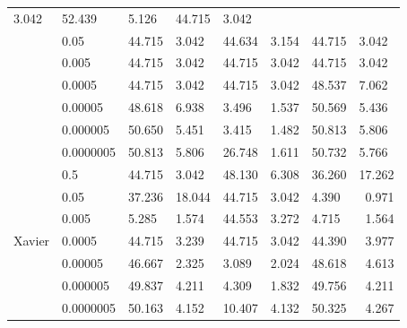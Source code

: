 \begin{table}[H]
\begin{tabular}{cl|llllll|}
    \multicolumn{1}{l|}{3.042} &
    52.439 &
    \multicolumn{1}{l|}{5.126} &
    44.715 &
    3.042 \\
\multicolumn{1}{|c|}{} &
    0.05 &
    44.715 &
    \multicolumn{1}{l|}{3.042} &
    44.634 &
    \multicolumn{1}{l|}{3.154} &
    44.715 &
    3.042 \\
\multicolumn{1}{|c|}{} &
    0.005 &
    44.715 &
    \multicolumn{1}{l|}{3.042} &
    44.715 &
    \multicolumn{1}{l|}{3.042} &
    44.715 &
    3.042 \\
\multicolumn{1}{|c|}{} &
    0.0005 &
    44.715 &
    \multicolumn{1}{l|}{3.042} &
    44.715 &
    \multicolumn{1}{l|}{3.042} &
    48.537 &
    7.062 \\
\multicolumn{1}{|c|}{} &
    0.00005 &
    48.618 &
    \multicolumn{1}{l|}{6.938} &
    3.496 &
    \multicolumn{1}{l|}{1.537} &
    50.569 &
    5.436 \\
\multicolumn{1}{|c|}{} &
    0.000005 &
    50.650 &
    \multicolumn{1}{l|}{5.451} &
    3.415 &
    \multicolumn{1}{l|}{1.482} &
    50.813 &
    5.806 \\
\multicolumn{1}{|c|}{} &
    0.0000005 &
    50.813 &
    \multicolumn{1}{l|}{5.806} &
    26.748 &
    \multicolumn{1}{l|}{1.611} &
    50.732 &
    5.766 \\ \hline
\multicolumn{1}{|c|}{\multirow{7}{*}{Xavier}} &
    0.5 &
    44.715 &
    \multicolumn{1}{l|}{3.042} &
    48.130 &
    \multicolumn{1}{l|}{6.308} &
    36.260 &
    \multicolumn{1}{r|}{17.262} \\
\multicolumn{1}{|c|}{} &
    0.05 &
    37.236 &
    \multicolumn{1}{l|}{18.044} &
    44.715 &
    \multicolumn{1}{l|}{3.042} &
    4.390 &
    \multicolumn{1}{r|}{0.971} \\
\multicolumn{1}{|c|}{} &
    0.005 &
    5.285 &
    \multicolumn{1}{l|}{1.574} &
    44.553 &
    \multicolumn{1}{l|}{3.272} &
    4.715 &
    \multicolumn{1}{r|}{1.564} \\
\multicolumn{1}{|c|}{} &
    0.0005 &
    44.715 &
    \multicolumn{1}{l|}{3.239} &
    44.715 &
    \multicolumn{1}{r|}{3.042} &
    44.390 &
    \multicolumn{1}{r|}{3.977} \\
\multicolumn{1}{|c|}{} &
    0.00005 &
    46.667 &
    \multicolumn{1}{l|}{2.325} &
    3.089 &
    \multicolumn{1}{r|}{2.024} &
    48.618 &
    \multicolumn{1}{r|}{4.613} \\
\multicolumn{1}{|c|}{} &
    0.000005 &
    49.837 &
    \multicolumn{1}{l|}{4.211} &
    4.309 &
    \multicolumn{1}{l|}{1.832} &
    49.756 &
    \multicolumn{1}{r|}{4.211} \\
\multicolumn{1}{|c|}{} &
    0.0000005 &
    50.163 &
    \multicolumn{1}{l|}{4.152} &
    10.407 &
    \multicolumn{1}{l|}{4.132} &
    50.325 &
    \multicolumn{1}{r|}{4.267} \\ \hline
\end{tabular}
\end{table}

